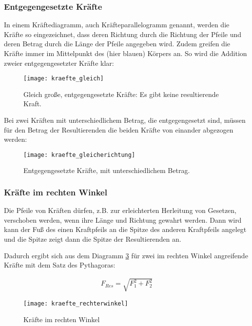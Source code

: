 \subsubsection{Entgegengesetzte Kräfte}

In einem Kräftediagramm, auch Kräfteparallelogramm genannt, werden die Kräfte so eingezeichnet, dass deren Richtung durch die Richtung der Pfeile und deren Betrag durch die Länge der Pfeile angegeben wird. Zudem greifen die Kräfte immer im Mittelpunkt des (hier blauen) Körpers an. So wird die Addition zweier entgegengesetzter Kräfte klar:

\begin{figure}[h!]
	\centering
	\texttt{[image: kraefte\_gleich]}
	\caption{Gleich große, entgegengesetzte Kräfte: Es gibt keine resultierende Kraft.}
	\label{fig:kraefte_gleich}
\end{figure}

\noindent Bei zwei Kräften mit unterschiedlichem Betrag, die entgegengesetzt sind, müssen für den Betrag der Resultierenden die beiden Kräfte von einander abgezogen werden:

\begin{figure}[h!]
	\centering
	\texttt{[image: kraefte\_gleicherichtung]}
	\caption{Entgegengesetzte Kräfte, mit unterschiedlichem Betrag.}
	\label{fig:kraefte_gleicherichtung}
\end{figure}

\subsubsection{Kräfte im rechten Winkel}

\noindent Die Pfeile von Kräften dürfen, z.B. zur erleichterten Herleitung von Gesetzen, verschoben werden, wenn ihre Länge und Richtung gewahrt werden. Dann wird kann der Fuß des einen Kraftpfeils an die Spitze des anderen Kraftpfeils angelegt und die Spitze zeigt dann die Spitze der Resultierenden an.

Dadurch ergibt sich aus dem Diagramm \ref{fig:kraefte_rechterwinkel} für zwei im rechten Winkel angreifende Kräfte mit dem Satz des Pythagoras:

\begin{align}
	F_{Res} = \sqrt{F_1^2 + F_2^2}
\end{align}

\begin{figure}[h!]
	\centering
	\texttt{[image: kraefte\_rechterwinkel]}
	\caption{Kräfte im rechten Winkel}
	\label{fig:kraefte_rechterwinkel}
\end{figure}


